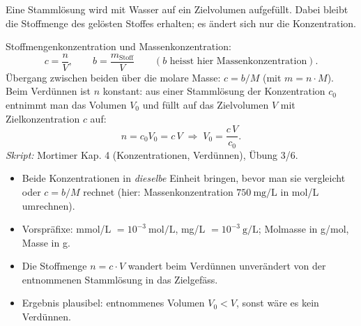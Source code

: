 

Eine Stammlösung wird mit Wasser auf ein Zielvolumen aufgefüllt. Dabei bleibt
die Stoffmenge des gelösten Stoffes erhalten; es ändert sich nur die
Konzentration.

\begin{werkzeugkasten}
Stoffmengenkonzentration und Massenkonzentration:
\begin{equation}
  c = \frac{n}{V}, \qquad
  b = \frac{m_{\text{Stoff}}}{V}
  \qquad (b \text{ heisst hier Massenkonzentration}).
\end{equation}
Übergang zwischen beiden über die molare Masse:
$c = b / M$ (mit $m = n\cdot M$).
Beim Verdünnen ist $n$ konstant: aus einer Stammlösung der
Konzentration $c_0$ entnimmt man das Volumen $V_0$ und füllt auf das Zielvolumen
$V$ mit Zielkonzentration $c$ auf:
\begin{equation}
  n = c_0 V_0 = c\,V \;\Longrightarrow\;
  V_0 = \frac{c\,V}{c_0}.
\end{equation}
\textit{Skript:} Mortimer Kap. 4 (Konzentrationen, Verdünnen), Übung 3/6.
\end{werkzeugkasten}

\begin{achtung}
\begin{itemize}
  \item Beide Konzentrationen in \emph{dieselbe} Einheit bringen, bevor man
        sie vergleicht oder $c = b/M$ rechnet (hier: Massenkonzentration
        $750\ \mathrm{mg/L}$ in mol/L umrechnen).
  \item Vorspräfixe: mmol/L $= 10^{-3}\ \mathrm{mol/L}$, mg/L
        $= 10^{-3}\ \mathrm{g/L}$; Molmasse in g/mol, Masse in g.
  \item Die Stoffmenge $n = c\cdot V$ wandert beim Verdünnen unverändert von
        der entnommenen Stammlösung in das Zielgefäss.
  \item Ergebnis plausibel: entnommenes Volumen $V_0 < V$, sonst wäre es kein
        Verdünnen.
\end{itemize}
\end{achtung}
